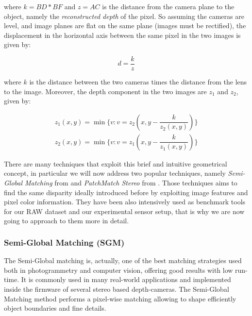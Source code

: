where $k = BD * BF$ and $z = AC$ is the distance from the camera plane to the object, namely the \emph{reconstructed depth} of the pixel. So assuming the cameras are level, and image planes are flat on the same plane (images must be rectified), the displacement in the horizontal axis between the same pixel in the two images is given by:

\begin{equation}
    \label{eq:disparity1}
    d = \dfrac{k}{z}
\end{equation}

where $k$ is the distance between the two cameras times the distance from the lens to the image. Moreover, the depth component in the two images are $z_{1}$ and $z_{2}$, given by:

\begin{equation}
    \label{eq:depth}
    \begin{aligned}
    z_1(x, y) = \min\{v : v = z_2(x, y - \dfrac{k}{z_2(x,y)})\} \\
    z_2(x, y) = \min\{v : v = z_1(x, y - \dfrac{k}{z_1(x,y)})\}
    \end{aligned}
\end{equation}

There are many techniques that exploit this brief and intuitive geometrical concept, in particular we will now address two popular techniques, namely \emph{Semi-Global Matching} from  \cite{hirschmuller2005SemiGlobal} and \emph{PatchMatch Stereo} from \cite{bleyer2011PatchMatchStereo}. Those techniques aims to find the same disparity ideally introduced before by exploiting image features and pixel color information. They have been also intensively used as benchmark tools for our RAW dataset and our experimental sensor setup, that is why we are now going to approach to them more in detail.


\subsubsection{Semi-Global Matching (SGM)}\label{subsec:semiglobalmatching}
The Semi-Global matching is, actually, one of the best matching strategies used both in photogrammetry and computer vision, offering good results with low run-time. It is commonly used in many real-world applications and implemented inside the firmware of several stereo based depth-cameras. The Semi-Global Matching method \cite{hirschmuller2005SemiGlobal} performs a pixel-wise matching allowing to shape efficiently object boundaries and fine details. 

